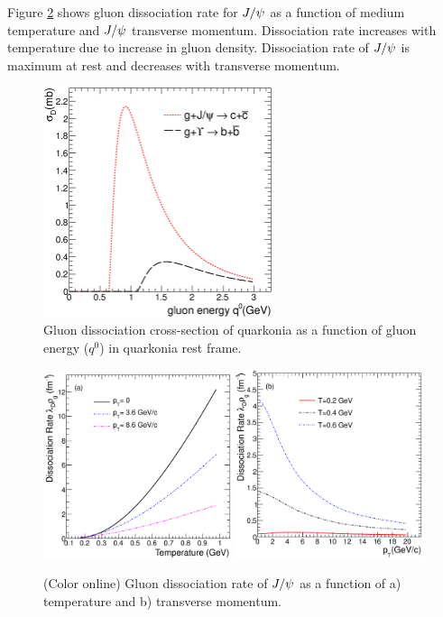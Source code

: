 \documentclass[aps,prc,preprint,superscriptaddress,showpacs,showkeys]{revtex4-1}
\begin{document}
 Figure \ref{fig:DRateVsTempAndPt} shows  gluon dissociation rate for $J/\psi$ as a 
function of medium temperature and $J/\psi$ transverse momentum. Dissociation rate increases 
with temperature due to increase in gluon density. Dissociation rate of $J/\psi$ is maximum 
at rest and decreases with transverse momentum.


\begin{figure}
\includegraphics[width=0.60\textwidth]{Figures/Fig2_SigmaDq0.eps}
\caption{Gluon dissociation cross-section of quarkonia as a function of gluon energy ($q^{0}$) in
quarkonia rest frame.}
\label{fig:SigmaDQ0}
\end{figure}

\begin{figure}
\includegraphics[width=0.49\textwidth]{Figures/Fig3a_DRateVsT.eps}
\includegraphics[width=0.49\textwidth]{Figures/Fig3b_DRateVsPt.eps}
\caption{(Color online) Gluon dissociation rate of $J/\psi$ as a function of a) temperature and  b) transverse momentum.}
\label{fig:DRateVsTempAndPt}
\end{figure}
\end{document}
